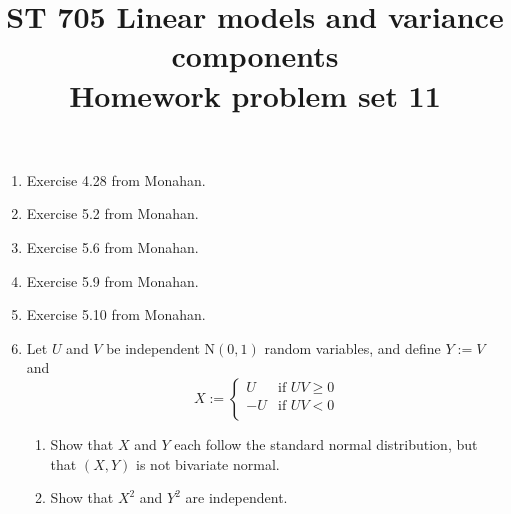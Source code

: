 \documentclass[11pt]{article}
\title{ST 705 Linear models and variance components \\ 
        Homework problem set 11}
\begin{document}
\maketitle

\begin{enumerate}


\item Exercise 4.28 from Monahan.

\item Exercise 5.2 from Monahan.

\item Exercise 5.6 from Monahan.

\item Exercise 5.9 from Monahan.

\item Exercise 5.10 from Monahan.

\item Let $U$ and $V$ be independent $\text{N}(0,1)$ random variables, and define $Y := V$ and 
\[
X := 
\begin{cases}
U & \text{if } UV \ge 0 \\
-U & \text{if } UV < 0 \\
\end{cases}
\]
\begin{enumerate}
\item Show that $X$ and $Y$ each follow the standard normal distribution, but that $(X, Y)$ is not bivariate normal.
\item Show that $X^{2}$ and $Y^{2}$ are independent.
\end{enumerate}


\end{enumerate}
\end{document}
